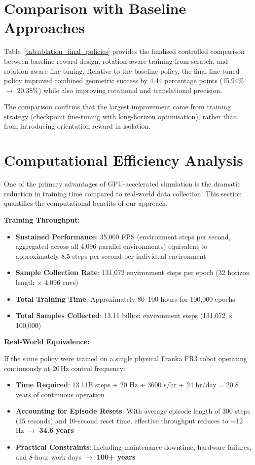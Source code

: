 \documentclass[12pt,a4paper,oneside]{report}
\begin{document}
\section{Comparison with Baseline Approaches}

Table~\ref{tab:ablation_final_policies} provides the finalised controlled comparison between baseline reward design, rotation-aware training from scratch, and rotation-aware fine-tuning. Relative to the baseline policy, the final fine-tuned policy improved combined geometric success by 4.44 percentage points (15.94\% $\rightarrow$ 20.38\%) while also improving rotational and translational precision.

The comparison confirms that the largest improvement came from training strategy (checkpoint fine-tuning with long-horizon optimisation), rather than from introducing orientation reward in isolation.

\section{Computational Efficiency Analysis}

One of the primary advantages of GPU-accelerated simulation is the dramatic reduction in training time compared to real-world data collection. This section quantifies the computational benefits of our approach.

\textbf{Training Throughput:}
\begin{itemize}
    \item \textbf{Sustained Performance}: 35{,}000 FPS (environment steps per second, aggregated across all 4{,}096 parallel environments) equivalent to approximately 8.5 steps per second per individual environment
    \item \textbf{Sample Collection Rate}: 131{,}072 environment steps per epoch (32 horizon length $\times$ 4{,}096 envs)
    \item \textbf{Total Training Time}: Approximately 80--100 hours for 100{,}000 epochs
    \item \textbf{Total Samples Collected}: 13.11 billion environment steps (131{,}072 $\times$ 100{,}000)
\end{itemize}

\textbf{Real-World Equivalence:}

If the same policy were trained on a single physical Franka FR3 robot operating continuously at 20\,Hz control frequency:
\begin{itemize}
    \item \textbf{Time Required}: 13.11B steps ÷ 20 Hz ÷ 3600 s/hr ÷ 24 hr/day = 20.8 years of continuous operation
    \item \textbf{Accounting for Episode Resets}: With average episode length of 300 steps (15 seconds) and 10-second reset time, effective throughput reduces to $\sim$12 Hz $\rightarrow$ \textbf{34.6 years}
    \item \textbf{Practical Constraints}: Including maintenance downtime, hardware failures, and 8-hour work days $\rightarrow$ \textbf{100+ years}
\end{itemize}
\end{document}
